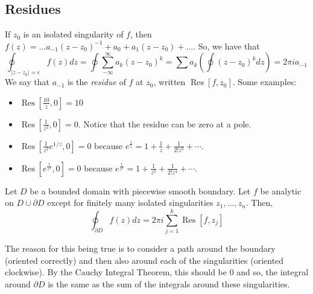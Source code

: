 \documentclass[11pt,leqno,oneside]{amsart}
\numberwithin{thm}{section}
\newcommand{\Res}{\operatorname{Res}}
\begin{document}
  \subsection*{Residues}
  If $z_0$ is an isolated singularity of $f$, then $f(z) = \ldots
  a_{-1}(z-z_0)^{-1} + a_0 + a_1(z-z_0)+\ldots$. So, we have that \[
    \oint_{|z-z_0| = \epsilon} f(z)dz = \oint \sum_{-\infty}^{\infty}
    a_k(z-z_0)^k = \sum a_k
    \left(
      \oint (z-z_0)^kdz
    \right) = 2\pi i a_{-1}
  \]
  We say that $a_{-1}$ is the \emph{residue} of $f$ at $z_0$, written
  $\Res[f,z_0]$. Some examples:
  \begin{example}
    \begin{itemize}
    \item $\Res[\frac{10}{z},0] = 10$
    \item $\Res[\frac{1}{z^2},0] = 0$. Notice that the residue can be
      zero at a pole.
    \item $\Res[\frac{1}{z^2}e^{1/z},0] = 0$ because $e^{\frac{1}{z}}
      = 1 + \frac{1}{z} + \frac{1}{2!z^2} + \cdots$.
    \item $\Res[e^{\frac{1}{z^2}},0] = 0$ because $e^{\frac{1}{z^2}} =
      1+ \frac{1}{z^2} + \frac{1}{2! z^4} + \cdots$.
    \end{itemize}
  \end{example}
  \begin{thm}
    Let $D$ be a bounded domain with piecewise smooth boundary. Let
    $f$ be analytic on $D \cup \partial D$ except for finitely many
    isolated singularities $z_1, \ldots, z_n$. Then, \[
      \oint_{\partial D} f(z)dz = 2 \pi i \sum_{j=1}^k \Res[f,z_j]
    \]
  \end{thm}
  The reason for this being true is to consider a path around the
  boundary (oriented correctly) and then also around each of the
  singularities (oriented clockwise). By the
  Cauchy Integral Theorem, this should be 0 and so, the integral
  around $\partial D$ is the same as the sum of the integrals around
  these singularities.
\end{document}
